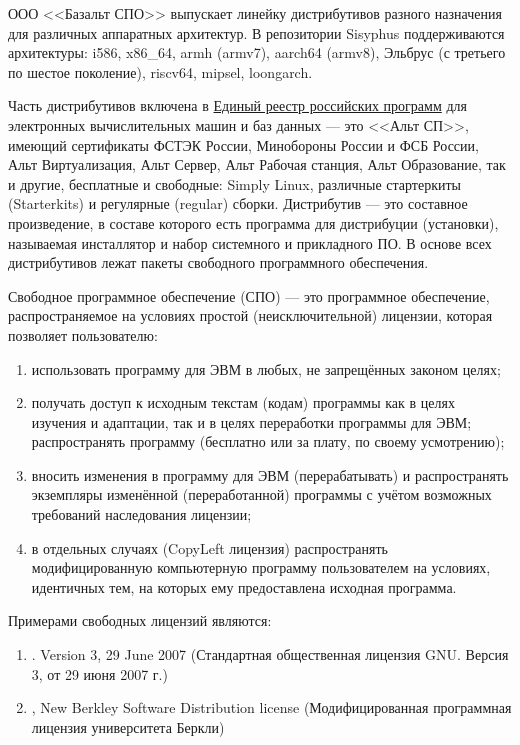 ООО <<Базальт СПО>> выпускает линейку дистрибутивов разного назначения для различных аппаратных архитектур.
В репозитории Sisyphus поддерживаются архитектуры: i586, x86\_64, armh (armv7), aarch64 (armv8), 
Эльбрус (с третьего по шестое поколение), riscv64, mipsel, loongarch.

Часть дистрибутивов включена в \href{reestr.digital.gov.ru}{Единый реестр российских программ} для электронных 
вычислительных машин и баз данных --- это <<Альт СП>>, имеющий сертификаты ФСТЭК России, 
Минобороны России и ФСБ России, Альт Виртуализация, Альт Сервер, Альт Рабочая станция, 
Альт Образование, так и другие, бесплатные и свободные: Simply Linux, различные стартеркиты 
(Starterkits) и регулярные (regular) сборки. Дистрибутив --- это составное произведение, 
в составе которого есть программа для дистрибуции (установки), называемая инсталлятор и 
набор системного и прикладного ПО. В основе всех дистрибутивов лежат пакеты свободного 
программного обеспечения.

Свободное программное обеспечение (СПО) --- это программное обеспечение, распространяемое 
на условиях простой (неисключительной) лицензии, которая позволяет пользователю:
\begin{enumerate}
    \item использовать программу для ЭВМ в любых, не запрещённых законом целях;
    \item получать доступ к исходным текстам (кодам) программы как в целях изучения и адаптации, 
    так и в целях переработки программы для ЭВМ; распространять программу (бесплатно или за плату, по своему усмотрению);
    \item вносить изменения в программу для ЭВМ (перерабатывать) и распространять экземпляры изменённой (переработанной) 
    программы с учётом возможных требований наследования лицензии;
    \item в отдельных случаях (CopyLeft лицензия) распространять модифицированную компьютерную программу пользователем 
    на условиях, идентичных тем, на которых ему предоставлена исходная программа.
\end{enumerate}

Примерами свободных лицензий являются:
\begin{enumerate}
    \item \href{https://www.gnu.org/licenses/gpl-3.0.html}{}. Version 3, 29 June 2007 (Стандартная общественная лицензия GNU. Версия 3, от 29 июня 2007 г.)
    \item \href{https://en.wikipedia.org/wiki/BSD_licenses}{}, New Berkley Software Distribution license (Модифицированная программная лицензия университета Беркли)
\end{enumerate}

